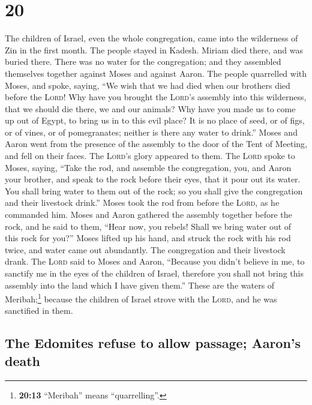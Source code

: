\hypertarget{section-19}{%
\section{20}\label{section-19}}

 The children of Israel, even the whole congregation, came
into the wilderness of Zin in the first month. The people stayed in
Kadesh. Miriam died there, and was buried there.  There
was no water for the congregation; and they assembled themselves
together against Moses and against Aaron.  The people
quarrelled with Moses, and spoke, saying, ``We wish that we had died
when our brothers died before the \textsc{Lord}!  Why have
you brought the \textsc{Lord}'s assembly into this wilderness, that we
should die there, we and our animals?  Why have you made
us to come up out of Egypt, to bring us in to this evil place? It is no
place of seed, or of figs, or of vines, or of pomegranates; neither is
there any water to drink.''  Moses and Aaron went from the
presence of the assembly to the door of the Tent of Meeting, and fell on
their faces. The \textsc{Lord}'s glory appeared to them. 
The \textsc{Lord} spoke to Moses, saying,  ``Take the rod,
and assemble the congregation, you, and Aaron your brother, and speak to
the rock before their eyes, that it pour out its water. You shall bring
water to them out of the rock; so you shall give the congregation and
their livestock drink.''  Moses took the rod from before
the \textsc{Lord}, as he commanded him.  Moses and Aaron
gathered the assembly together before the rock, and he said to them,
``Hear now, you rebels! Shall we bring water out of this rock for you?''
 Moses lifted up his hand, and struck the rock with his
rod twice, and water came out abundantly. The congregation and their
livestock drank.  The \textsc{Lord} said to Moses and
Aaron, ``Because you didn't believe in me, to sanctify me in the eyes of
the children of Israel, therefore you shall not bring this assembly into
the land which I have given them.''  These are the waters
of Meribah;\footnote{\textbf{20:13} ``Meribah'' means ``quarrelling''.}
because the children of Israel strove with the \textsc{Lord}, and he was
sanctified in them.

\hypertarget{the-edomites-refuse-to-allow-passage-aarons-death}{%
\subsection{The Edomites refuse to allow passage; Aaron's
death}\label{the-edomites-refuse-to-allow-passage-aarons-death}}

